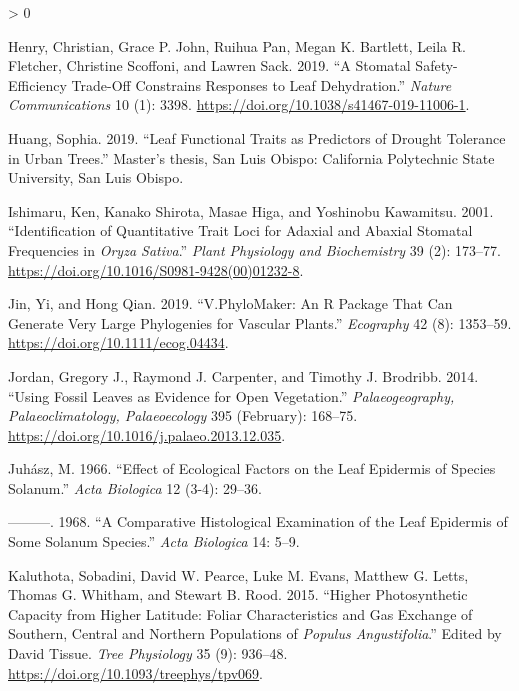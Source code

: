 \documentclass[
  10pt,
]{article}
\newlength{\cslhangindent}
\newenvironment{CSLReferences}[2] %
 {%
  \setlength{\parindent}{0pt}
  \ifodd #1 \everypar{\setlength{\hangindent}{\cslhangindent}}\ignorespaces\fi
  \ifnum #2 > 0
  \setlength{\parskip}{#2\baselineskip}
  \fi
 }%
 {}
\begin{document}
\begin{CSLReferences}{1}{0}
\leavevmode\hypertarget{ref-henry_stomatal_2019}{}%
Henry, Christian, Grace P. John, Ruihua Pan, Megan K. Bartlett, Leila R. Fletcher, Christine Scoffoni, and Lawren Sack. 2019. {``A Stomatal Safety-Efficiency Trade-Off Constrains Responses to Leaf Dehydration.''} \emph{Nature Communications} 10 (1): 3398. \url{https://doi.org/10.1038/s41467-019-11006-1}.

\leavevmode\hypertarget{ref-huang_leaf_2019}{}%
Huang, Sophia. 2019. {``Leaf Functional Traits as Predictors of Drought Tolerance in Urban Trees.''} Master's thesis, San Luis Obispo: California Polytechnic State University, San Luis Obispo.

\leavevmode\hypertarget{ref-ishimaru_identification_2001}{}%
Ishimaru, Ken, Kanako Shirota, Masae Higa, and Yoshinobu Kawamitsu. 2001. {``Identification of Quantitative Trait Loci for Adaxial and Abaxial Stomatal Frequencies in \emph{{Oryza} Sativa}.''} \emph{Plant Physiology and Biochemistry} 39 (2): 173--77. \url{https://doi.org/10.1016/S0981-9428(00)01232-8}.

\leavevmode\hypertarget{ref-jin_vphylomaker_2019}{}%
Jin, Yi, and Hong Qian. 2019. {``V.{PhyloMaker}: An {R} Package That Can Generate Very Large Phylogenies for Vascular Plants.''} \emph{Ecography} 42 (8): 1353--59. \url{https://doi.org/10.1111/ecog.04434}.

\leavevmode\hypertarget{ref-jordan_using_2014}{}%
Jordan, Gregory J., Raymond J. Carpenter, and Timothy J. Brodribb. 2014. {``Using Fossil Leaves as Evidence for Open Vegetation.''} \emph{Palaeogeography, Palaeoclimatology, Palaeoecology} 395 (February): 168--75. \url{https://doi.org/10.1016/j.palaeo.2013.12.035}.

\leavevmode\hypertarget{ref-juhasz_effect_1966}{}%
Juhász, M. 1966. {``Effect of Ecological Factors on the Leaf Epidermis of Species {Solanum}.''} \emph{Acta Biologica} 12 (3-4): 29--36.

\leavevmode\hypertarget{ref-juhasz_comparative_1968}{}%
---------. 1968. {``A Comparative Histological Examination of the Leaf Epidermis of Some {Solanum} Species.''} \emph{Acta Biologica} 14: 5--9.

\leavevmode\hypertarget{ref-kaluthota_higher_2015}{}%
Kaluthota, Sobadini, David W. Pearce, Luke M. Evans, Matthew G. Letts, Thomas G. Whitham, and Stewart B. Rood. 2015. {``Higher Photosynthetic Capacity from Higher Latitude: Foliar Characteristics and Gas Exchange of Southern, Central and Northern Populations of \emph{{Populus} Angustifolia}.''} Edited by David Tissue. \emph{Tree Physiology} 35 (9): 936--48. \url{https://doi.org/10.1093/treephys/tpv069}.


\end{CSLReferences}
\end{document}
